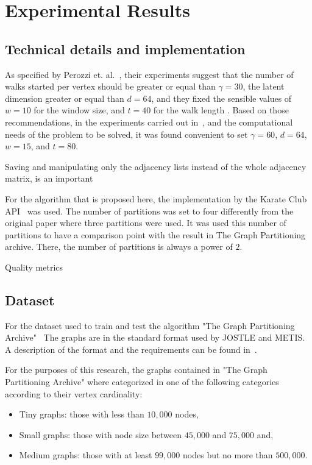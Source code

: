%
%
\let\textcircled=\pgftextcircled
\chapter{Experimental Results}
\label{Chapter4}

\section{Technical details and implementation}
As specified by Perozzi et. al.~\cite{deepwalk}, their experiments suggest that the number of walks started per vertex should be greater or equal than $\gamma=30$, the latent dimension greater or equal than $d=64$, and they fixed the sensible values of $w=10$ for the window size, and $t=40$ for the walk length . Based on those recommendations, in the experiments carried out in~\cite{deepwalk_hyper}, and the computational needs of the problem to be solved, it was found convenient to set $\gamma=60$, $d=64$, $w=15$, and $t=80$.

Saving and manipulating only the adjacency lists instead of the whole adjacency matrix, is an important 

For the algorithm that is proposed here, the implementation by the Karate Club API~\cite{karateclub} was used.
The number of partitions was set to four differently from the original paper where three partitions were used. It was used this number of partitions to have a comparison point with the result in The Graph Partitioning archive. There, the number of partitions is always a power of $2$.

Quality metrics
\section{Dataset}

    For the dataset used to train and test the algorithm "The Graph Partitioning Archive"~\cite{archive}
The graphs are in the standard format used by JOSTLE and METIS. A description of the format and the requirements can be found in~\cite{jostle}.

For the purposes of this research, the graphs contained in "The Graph Partitioning Archive" where categorized in one of the following categories according to their vertex cardinality: 
\begin{itemize}
    \item Tiny graphs: those with less than $10,000$ nodes,
    \item Small graphs: those with node size between $45,000$ and $75,000$ and,
    \item Medium graphs: those with at least $99,000$ nodes but no more than $500,000$.
\end{itemize}

